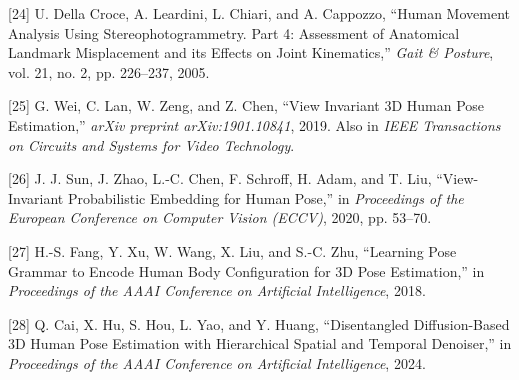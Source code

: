 \documentclass[12pt,a4paper]{report}
\begin{document}
{[24] U. Della Croce, A. Leardini, L. Chiari, and A. Cappozzo, ``Human Movement Analysis Using Stereophotogrammetry. Part 4: Assessment of Anatomical Landmark Misplacement and its Effects on Joint Kinematics,'' \textit{Gait \& Posture}, vol. 21, no. 2, pp. 226--237, 2005.

[25] G. Wei, C. Lan, W. Zeng, and Z. Chen, ``View Invariant 3D Human Pose Estimation,'' \textit{arXiv preprint arXiv:1901.10841}, 2019. Also in \textit{IEEE Transactions on Circuits and Systems for Video Technology}.

[26] J. J. Sun, J. Zhao, L.-C. Chen, F. Schroff, H. Adam, and T. Liu, ``View-Invariant Probabilistic Embedding for Human Pose,'' in \textit{Proceedings of the European Conference on Computer Vision (ECCV)}, 2020, pp. 53--70.

[27] H.-S. Fang, Y. Xu, W. Wang, X. Liu, and S.-C. Zhu, ``Learning Pose Grammar to Encode Human Body Configuration for 3D Pose Estimation,'' in \textit{Proceedings of the AAAI Conference on Artificial Intelligence}, 2018.

[28] Q. Cai, X. Hu, S. Hou, L. Yao, and Y. Huang, ``Disentangled Diffusion-Based 3D Human Pose Estimation with Hierarchical Spatial and Temporal Denoiser,'' in \textit{Proceedings of the AAAI Conference on Artificial Intelligence}, 2024.
}
\end{document}
